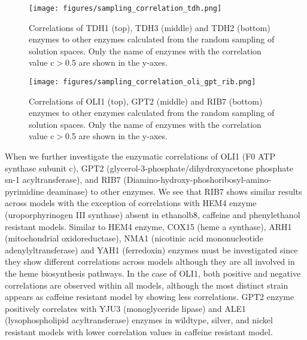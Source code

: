 \begin{figure}[H]
  \begin{center}
  \texttt{[image: figures/sampling\_correlation\_tdh.png]}
  \caption[Correlations of TDH1 (top), TDH3 (middle) and TDH2 (bottom) enzymes to other enzymes calculated from the random sampling of solution spaces. Only the name of enzymes with the correlation value c$>$0.5 are shown in the y-axes]{Correlations of TDH1 (top), TDH3 (middle) and TDH2 (bottom) enzymes to other enzymes calculated from the random sampling of solution spaces. Only the name of enzymes with the correlation value c$>$0.5 are shown in the y-axes.}
  \label{fig:sampling_correlation_tdh}
  \end{center}
\end{figure}

\begin{figure}[H]
  \begin{center}
  \texttt{[image: figures/sampling\_correlation\_oli\_gpt\_rib.png]}
  \caption[Correlations of OLI1 (top), GPT2 (middle) and RIB7 (bottom) enzymes to other enzymes calculated from the random sampling of solution spaces. Only the name of enzymes with the correlation value c$>$0.5 are shown in the y-axes]{Correlations of OLI1 (top), GPT2 (middle) and RIB7 (bottom) enzymes to other enzymes calculated from the random sampling of solution spaces. Only the name of enzymes with the correlation value c$>$0.5 are shown in the y-axes.}
  \label{fig:sampling_correlation_oli_gpt_rib}
  \end{center}
\end{figure}

When we further investigate the enzymatic correlations of OLI1 (F0 ATP synthase subunit c), GPT2 (glycerol-3-phosphate/dihydroxyacetone phosphate sn-1 acyltransferase), and RIB7 (Diamino-hydroxy-phoshoribosyl-amino-pyrimidine deaminase) to other enzymes. We see that RIB7 shows similar results across models with the exception of correlations with HEM4 enzyme (uroporphyrinogen III synthase) absent in ethanolb8, caffeine and phenylethanol resistant models. Similar to HEM4 enzyme, COX15 (heme a synthase), ARH1 (mitochondrial oxidoreductase), NMA1 (nicotinic acid mononucleotide adenylyltransferase) and YAH1 (ferredoxin) enzymes must be investigated since they show different correlations across models although they are all involved in the heme biosynthesis pathways. In the case of OLI1, both positive and negative correlations are observed within all models, although the most distinct strain appears as caffeine resistant model by showing less correlations. GPT2 enzyme positively correlates with YJU3 (monoglyceride lipase) and ALE1 (lysophospholipid acyltransferase) enzymes in wildtype, silver, and nickel resistant models with lower correlation values in caffeine resistant model.

